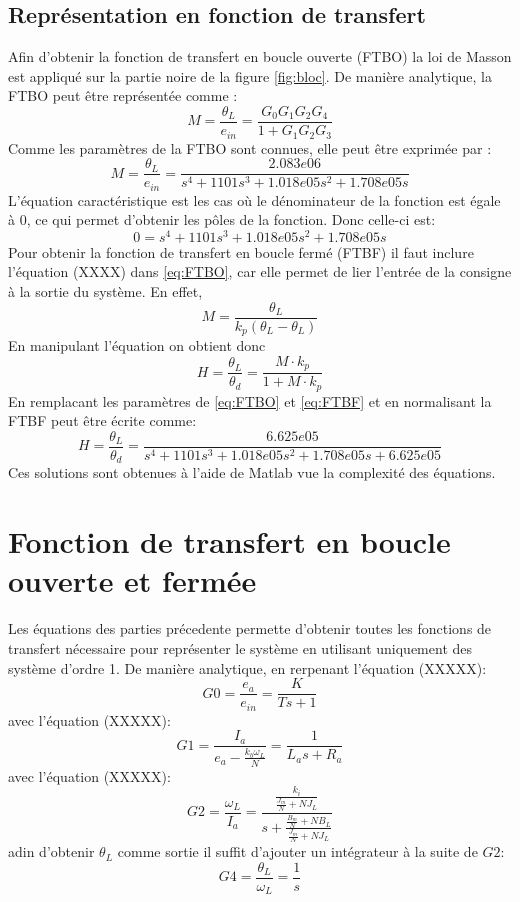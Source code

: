 \documentclass{udes_rapport} %
\begin{document}
\subsection{Représentation en fonction de transfert}
Afin d'obtenir la fonction de transfert en boucle ouverte (FTBO) la loi de Masson est appliqué sur la partie noire de la figure \ref{fig:bloc}. De manière analytique, la FTBO peut être représentée comme :
\begin{equation}
M = \frac{\theta_L}{e_{in}} = \frac{G_0 G_1 G_2 G_4}{1 + G_1 G_2 G_3}
\label{eq:FTBO}
\end{equation}
Comme les paramètres de la FTBO sont connues, elle peut être exprimée par :
\begin{equation}
M = \frac{\theta_L}{e_{in}} = \frac{2.083e06}{s^4 + 1101s^3 + 1.018e05s^2 + 1.708e05s}
\label{eq:nmum_FTBO}
\end{equation}
L'équation caractéristique est les cas où le dénominateur de la fonction est égale à 0, ce qui permet d'obtenir les pôles de la fonction. Donc celle-ci est:
\begin{equation}
0 = s^4 + 1101s^3 + 1.018e05s^2 + 1.708e05s
\label{eq:caracteristic}
\end{equation}
Pour obtenir la fonction de transfert en boucle fermé (FTBF) il faut inclure l'équation (XXXX) dans \eqref{eq:FTBO}, car elle permet de lier l'entrée de la consigne à la sortie du système. En effet,
\[	M = \frac{\theta_L}{k_p (\theta_L -\theta_L )}	\]
En manipulant l'équation on obtient donc
\begin{equation}
H = \frac{\theta_L}{\theta_d} = \frac{M \cdot k_p}{1+M \cdot k_p}
\label{eq:FTBF}
\end{equation}
En remplacant les paramètres de \eqref{eq:FTBO} et \eqref{eq:FTBF} et en normalisant la FTBF peut être écrite comme:
\begin{equation}
H = \frac{\theta_L}{\theta_d} = \frac{6.625e05}{s^4 + 1101s^3 + 1.018e05s^2 + 1.708e05s + 6.625e05}
\label{eq:nmum_FTBF}
\end{equation}
Ces solutions sont obtenues à l'aide de Matlab vue la complexité des équations.


\section{Fonction de transfert en boucle ouverte et fermée}
Les équations des parties précedente permette d'obtenir toutes les fonctions de transfert nécessaire pour représenter le système en utilisant uniquement des système d'ordre 1. De manière analytique, en rerpenant l'équation (XXXXX):
\[	G0 = \frac{e_a}{e_{in}} = \frac{K}{Ts + 1}	\]
avec l'équation (XXXXX):
\[	G1 = \frac{I_a}{e_a - \frac{k_b \omega_L}{N}} = \frac{1}{L_a s + R_a}						\]
avec l'équation (XXXXX):
\[	G2 = \frac{\omega_L}{I_a} = \frac{\frac{k_i}{\frac{J_m}{N}+N J_L}}{s + \frac{\frac{B_m}{N} + N B_L}{\frac{J_m}{N}+N J_L}}	\]
adin d'obtenir $\theta _L$ comme sortie il suffit d'ajouter un intégrateur à la suite de $G2$:
\[	G4 = \frac{\theta _L}{\omega _L} = \frac{1}{s}	\]
\end{document}
